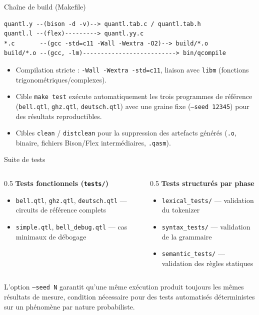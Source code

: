 \documentclass[10pt]{beamer}
\begin{document}
\begin{frame}[fragile]{Chaîne de build (Makefile)}
\begin{lstlisting}[basicstyle=\ttfamily\scriptsize]
quantl.y --(bison -d -v)--> quantl.tab.c / quantl.tab.h
quantl.l --(flex)---------> quantl.yy.c
*.c       --(gcc -std=c11 -Wall -Wextra -O2)--> build/*.o
build/*.o --(gcc, -lm)--------------------------> bin/qcompile
\end{lstlisting}
  \begin{itemize}
    \small
    \item Compilation stricte : \texttt{-Wall -Wextra -std=c11}, liaison avec \texttt{libm} (fonctions trigonométriques/complexes).
    \item Cible \texttt{make test} exécute automatiquement les trois programmes de référence (\texttt{bell.qtl}, \texttt{ghz.qtl}, \texttt{deutsch.qtl}) avec une graine fixe (\texttt{--seed 12345}) pour des résultats reproductibles.
    \item Cibles \texttt{clean} / \texttt{distclean} pour la suppression des artefacts générés (\texttt{.o}, binaire, fichiers Bison/Flex intermédiaires, \texttt{.qasm}).
  \end{itemize}
\end{frame}

\begin{frame}{Suite de tests}
  \begin{columns}[T]
    \begin{column}{0.5\textwidth}
      \textbf{Tests fonctionnels (\texttt{tests/})}
      \begin{itemize}
        \small
        \item \texttt{bell.qtl}, \texttt{ghz.qtl}, \texttt{deutsch.qtl} --- circuits de référence complets
        \item \texttt{simple.qtl}, \texttt{bell\_debug.qtl} --- cas minimaux de débogage
      \end{itemize}
    \end{column}
    \begin{column}{0.5\textwidth}
      \textbf{Tests structurés par phase}
      \begin{itemize}
        \small
        \item \texttt{lexical\_tests/} --- validation du tokenizer
        \item \texttt{syntax\_tests/} --- validation de la grammaire
        \item \texttt{semantic\_tests/} --- validation des règles statiques
      \end{itemize}
    \end{column}
  \end{columns}
  \vspace{10pt}
  \begin{keybox}[title=Reproductibilité]
    L'option \texttt{--seed N} garantit qu'une même exécution produit toujours les mêmes résultats de mesure, condition nécessaire pour des tests automatisés déterministes sur un phénomène par nature probabiliste.
  \end{keybox}
\end{frame}
\end{document}
